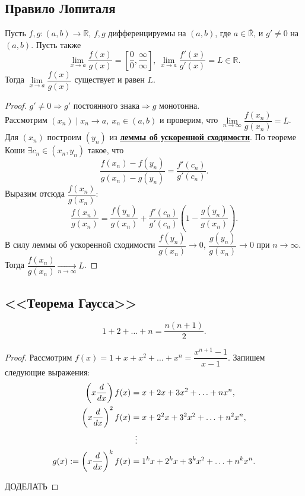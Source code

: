 \subsection{Правило Лопиталя}

\begin{theorem} \hypertarget{t3}{}
	Пусть $f, g \colon (a, b) \to \mathbb{R}$, $f, g$ дифференцируемы на $(a, b)$, где $a \in \overline{\mathbb{R}}$, и $g' \neq 0$ на $(a, b)$.
	Пусть также \[
		\lim_{x \to a} \frac{f(x)}{g(x)} = \left[ \frac00, \frac{\infty}{\infty} \right],
		~\lim_{x \to a} \frac{f'(x)}{g'(x)} = L \in \mathbb{R}.
	\]
	Тогда $\lim\limits_{x \to a} \dfrac{f(x)}{g(x)}$ существует и равен $L$.
\end{theorem}
\begin{proof}
	$g' \neq 0 \Rightarrow g' \text{ постоянного знака} \Rightarrow g \text{ монотонна}$. \\
	Рассмотрим $(x_n) \mid x_n \to a, ~x_n \in (a, b)$ и проверим, что $\lim\limits_{n \to \infty} \dfrac{f(x_n)}{g(x_n)} = L$.
	Для $(x_n)$ построим $(y_n)$ из \hyperlink{t2}{\bfseries леммы об ускоренной сходимости}. По теореме Коши
	$\exists c_n \in (x_n, y_n)$ такое, что \[
		\frac{f(x_n) - f(y_n)}{g(x_n) - g(y_n)} = \frac{f'(c_n)}{g'(c_n)}.
	\]
	Выразим отсюда $\dfrac{f(x_n)}{g(x_n)}$: \[
		\frac{f(x_n)}{g(x_n)} = \frac{f(y_n)}{g(x_n)} + \frac{f'(c_n)}{g'(c_n)} \left( 1 - \frac{g(y_n)}{g(x_n)} \right).
	\]
	В силу леммы об ускоренной сходимости $\dfrac{f(y_n)}{g(x_n)} \to 0$, $\dfrac{g(y_n)}{g(x_n)} \to 0$ при \(n \to \infty\). Тогда $\dfrac{f(x_n)}{g(x_n)} \xrightarrow[n \to \infty]{} L$.
\end{proof}

\subsection{<<Теорема Гаусса>>}

\begin{theorem} \hypertarget{t4}{}
	\[
		1 + 2 + \ldots + n = \frac{n (n + 1)}{2}.
	\]
\end{theorem}
\begin{proof}
	Рассмотрим \(f(x) = 1 + x + x^2 + \ldots + x^n = \dfrac{x^{n + 1} - 1}{x - 1}\). Запишем следующие выражения:
	\begin{align*}
		 		  \left( x \frac{d}{dx} \right) f(x) &= x + 2 x + 3 x^2 + \ldots + n x^n, \\
				\left( x \frac{d}{dx} \right)^2 f(x) &= x + 2^2 x + 3^2 x^2 + \ldots + n^2 x^n, \\
													 &\enskip \vdots \\
		g(x) := \left( x \frac{d}{dx} \right)^k f(x) &= 1^k x + 2^k x + 3^k x^2 + \ldots + n^k x^n.	\\
	\end{align*}
	
	ДОДЕЛАТЬ
\end{proof}

